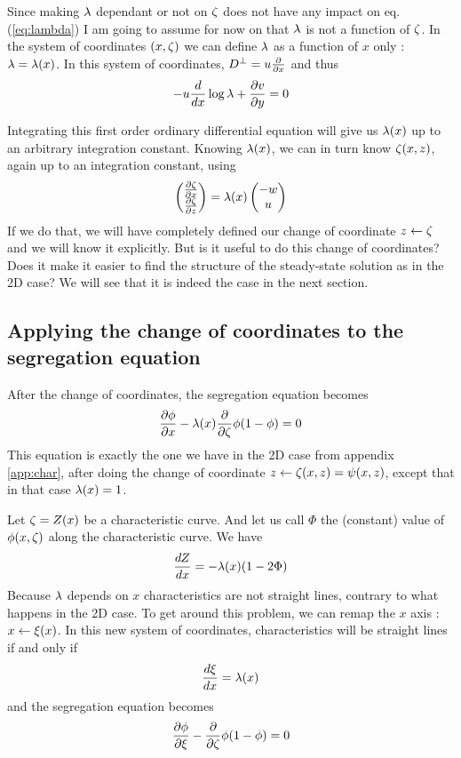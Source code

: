 Since making $\lambda$ dependant or not on $\zeta$ does not have any impact on  eq. (\ref{eq:lambda}) I am going to assume for now on that $\lambda$ is not a function of $\zeta$. In the system of coordinates $(x, \zeta)$ we can define $\lambda$ as a function of $x$ only : $\lambda = \lambda(x)$.
In this system of coordinates, $D^\perp = u \frac{\partial {}}{\partial {x}}$ and thus
\begin{equation}
	-u \frac{d {}}{d {x}} \log \lambda + \frac{\partial {v}}{\partial {y}} = 0
\end{equation}

Integrating this first order ordinary differential equation will give us $\lambda(x)$ up to an arbitrary integration constant. Knowing $\lambda(x)$, we can in turn know $\zeta(x,z)$, again up to an integration constant, using
\begin{equation}
	\begin{pmatrix}
	\frac{\partial {\ensuremath{\zeta}}}{\partial {x}}\\
	\frac{\partial {\ensuremath{\zeta}}}{\partial {z}} 
\end{pmatrix}
=
\lambda(x)
	\begin{pmatrix}
	-w\\
	u 
\end{pmatrix}
\end{equation}
If we do that, we will have completely defined our change of coordinate $z \leftarrow \zeta$ and we will know it explicitly.
But is it useful to do this change of coordinates? Does it make it easier to find the structure of the steady-state solution as in the 2D case? We will see that it is indeed the case in the next section.

\subsection{Applying the change of coordinates to the segregation equation}

After the change of coordinates, the segregation equation becomes
\begin{equation}
	\frac{\partial {\phi}}{\partial {x}} - \lambda(x) \frac{\partial {}}{\partial {\ensuremath{\zeta}}} \phi (1 - \phi) = 0
\end{equation}
This equation is exactly the one we have in the 2D case from appendix \ref{app:char}, after doing the change of coordinate $z \leftarrow \zeta(x,z)=\psi(x,z)$, except that in that case $\lambda(x) = 1$.

Let $\zeta = Z(x)$ be a characteristic curve. And let us call $\Phi$ the (constant) value of  $\phi(x,\zeta)$ along the characteristic curve. We have
\begin{equation}
	\frac{d {Z}}{d {x}} = - \lambda(x) ( 1 - 2 \Phi)
\end{equation}
Because $\lambda$ depends on $x$ characteristics are not straight lines, contrary to what happens in the 2D case. 
To get around this problem, we can remap the $x$ axis : $x \leftarrow \xi(x)$. 
In this new system of coordinates, characteristics will be straight lines if and only if
\begin{equation}
	\frac{d {\xi}}{d {x}} = \lambda(x)
\end{equation}
and the segregation equation becomes
\begin{equation}
	\frac{\partial {\phi}}{\partial {\ensuremath{\xi}}} - \frac{\partial {}}{\partial {\ensuremath{\zeta}}} \phi (1 - \phi) = 0
\end{equation}

